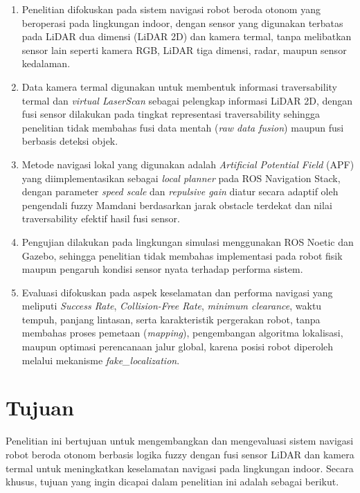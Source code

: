 \begin{enumerate}
\item Penelitian difokuskan pada sistem navigasi robot beroda otonom yang beroperasi pada lingkungan indoor, dengan sensor yang digunakan terbatas pada LiDAR dua dimensi (LiDAR 2D) dan kamera termal, tanpa melibatkan sensor lain seperti kamera RGB, LiDAR tiga dimensi, radar, maupun sensor kedalaman.

\item Data kamera termal digunakan untuk membentuk informasi traversability termal dan \textit{virtual LaserScan} sebagai pelengkap informasi LiDAR 2D, dengan fusi sensor dilakukan pada tingkat representasi traversability sehingga penelitian tidak membahas fusi data mentah (\textit{raw data fusion}) maupun fusi berbasis deteksi objek.

\item Metode navigasi lokal yang digunakan adalah \textit{Artificial Potential Field} (APF) yang diimplementasikan sebagai \textit{local planner} pada ROS Navigation Stack, dengan parameter \textit{speed scale} dan \textit{repulsive gain} diatur secara adaptif oleh pengendali fuzzy Mamdani berdasarkan jarak obstacle terdekat dan nilai traversability efektif hasil fusi sensor.

\item Pengujian dilakukan pada lingkungan simulasi menggunakan ROS Noetic dan Gazebo, sehingga penelitian tidak membahas implementasi pada robot fisik maupun pengaruh kondisi sensor nyata terhadap performa sistem.

\item Evaluasi difokuskan pada aspek keselamatan dan performa navigasi yang meliputi \textit{Success Rate}, \textit{Collision-Free Rate}, \textit{minimum clearance}, waktu tempuh, panjang lintasan, serta karakteristik pergerakan robot, tanpa membahas proses pemetaan (\textit{mapping}), peng\-embangan algoritma lokalisasi, maupun optimasi perencanaan jalur global, karena posisi robot diperoleh melalui mekanisme \textit{fake\_localization}.
\end{enumerate}


\section{Tujuan}
\label{sec:Tujuan}

Penelitian ini bertujuan untuk mengembangkan dan mengevaluasi sistem navigasi robot beroda otonom berbasis logika fuzzy dengan fusi sensor LiDAR dan kamera termal untuk meningkatkan keselamatan navigasi pada lingkungan indoor. Secara khusus, tujuan yang ingin dicapai dalam penelitian ini adalah sebagai berikut.

